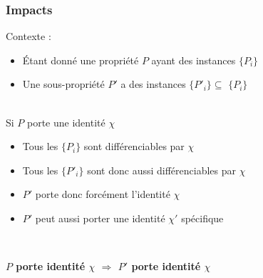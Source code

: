 \documentclass[draft]{beamer}
\begin{document}
\begin{frame}
\frametitle{Impacts}
\def\pa{$P$\xspace}
\def\pb{$P'$\xspace}
\def\ca{$\{P_i\}$\xspace}
\def\cb{$\{P'_i\}$\xspace}
\def\ia{$P_i$\xspace}
\def\ib{$P'_i$\xspace}
\def\ea{$\chi$\xspace}
\def\eb{$\chi'$\xspace}
Contexte :
\begin{itemize}
 \item Étant donné une propriété \pa ayant des instances \ca
 \item Une sous-propriété \pb a des instances \cb $\subseteq$ \ca
\end{itemize}
~\\
Si \pa porte une identité \ea
\begin{itemize}
 \item Tous les \ca sont différenciables par \ea
 \item Tous les \cb sont donc aussi différenciables par \ea
 \item \pb porte donc forcément l'identité \ea
 \item \pb peut aussi porter une identité \eb spécifique
\end{itemize}
~\\
\begin{center}
 \textbf{$P$ porte identité $\chi$ $\Rightarrow$ $P'$ porte identité $\chi$}
\end{center}
\end{frame}
\end{document}
